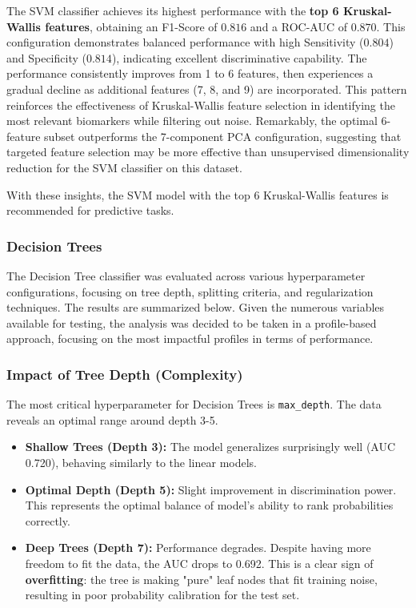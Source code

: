 \documentclass[12pt,a4paper]{article}
\begin{document}
The SVM classifier achieves its highest performance with the \textbf{top 6 Kruskal-Wallis features}, obtaining an F1-Score of $0.816$ and a ROC-AUC of $0.870$. This configuration demonstrates balanced performance with high Sensitivity ($0.804$) and Specificity ($0.814$), indicating excellent discriminative capability. The performance consistently improves from 1 to 6 features, then experiences a gradual decline as additional features (7, 8, and 9) are incorporated. This pattern reinforces the effectiveness of Kruskal-Wallis feature selection in identifying the most relevant biomarkers while filtering out noise. Remarkably, the optimal 6-feature subset outperforms the 7-component PCA configuration, suggesting that targeted feature selection may be more effective than unsupervised dimensionality reduction for the SVM classifier on this dataset. 

With these insights, the SVM model with the top 6 Kruskal-Wallis features is recommended for predictive tasks.


\subsubsection{Decision Trees}
The Decision Tree classifier was evaluated across various hyperparameter configurations, focusing on tree depth, splitting criteria, and regularization techniques. The results are summarized below. Given the numerous variables available for testing, the analysis was decided to be taken in a profile-based approach, focusing on the most impactful profiles in terms of performance.

\subsubsection*{Impact of Tree Depth (Complexity)}
The most critical hyperparameter for Decision Trees is \texttt{max\_depth}. The data reveals an optimal range around depth 3-5.

\begin{itemize}
    \item \textbf{Shallow Trees (Depth 3):} The model generalizes surprisingly well (AUC 0.720), behaving similarly to the linear models.
    \item \textbf{Optimal Depth (Depth 5):} Slight improvement in discrimination power. This represents the optimal balance of model's ability to rank probabilities correctly.
    \item \textbf{Deep Trees (Depth 7):} Performance degrades. Despite having more freedom to fit the data, the AUC drops to 0.692. This is a clear sign of \textbf{overfitting}: the tree is making "pure" leaf nodes that fit training noise, resulting in poor probability calibration for the test set.
\end{itemize}
\end{document}
